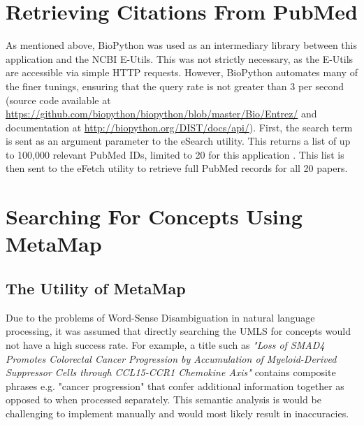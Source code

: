 \documentclass[Report.tex]{subfiles}
\begin{document}
\section{Retrieving Citations From PubMed}
As mentioned above, BioPython was used as an intermediary library between this application and the NCBI E-Utils. This was not strictly necessary, as the E-Utils are accessible via simple HTTP requests. However, BioPython automates many of the finer tunings, ensuring that the query rate is not greater than 3 per second (source code available at \url{https://github.com/biopython/biopython/blob/master/Bio/Entrez/} and documentation at \url{http://biopython.org/DIST/docs/api/}). First, the search term is sent as an argument parameter to the eSearch utility. This returns a list of up to 100,000 relevant PubMed IDs, limited to 20 for this application \cite{eutils-indepth}. This list is then sent to the eFetch utility to retrieve full PubMed records for all 20 papers.\newpage

\section{Searching For Concepts Using MetaMap}
\subsection{The Utility of MetaMap}
Due to the problems of Word-Sense Disambiguation in natural language processing, it was assumed that directly searching the UMLS for concepts would not have a high success rate. For example, a title such as \emph{"Loss of SMAD4 Promotes Colorectal Cancer Progression by Accumulation of Myeloid-Derived Suppressor Cells through CCL15-CCR1 Chemokine Axis"} contains composite phrases e.g. "cancer progression" that confer additional information together as opposed to when processed separately. This semantic analysis is would be challenging to implement manually and would most likely result in inaccuracies.
\end{document}
